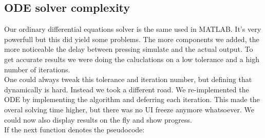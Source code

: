 \documentclass[10pt,a4paper]{report}
\begin{document}
		\subsection{ODE solver complexity}
			Our ordinary differential equations solver is the same used in MATLAB. It's very powerfull but this did yield some problems. The more components we added, the more noticeable the delay between pressing simulate and the actual output. To get accurate results we were doing the caluclations on a low tolerance and a high number of iterations. \\
			One could always tweak this tolerance and iteration number, but defining that dynamically is hard. Instead we took a different road. We re-implemented the ODE by implementing the algorithm and deferring each iteration. This made the overal solving time higher, but there was no UI freeze anymore whatsoever. We could now also display results on the fly and show progress.\\
			If the next function denotes the pseudocode:\\
\end{document}
